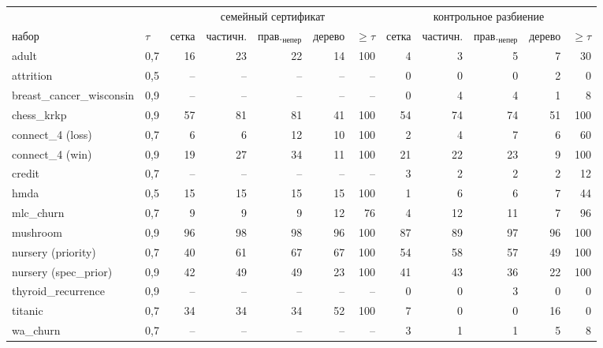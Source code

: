 \begin{tabular}{llrrrrrrrrrr}
\toprule
& & \multicolumn{5}{c}{семейный сертификат} & \multicolumn{5}{c}{контрольное разбиение}\\
набор & $\tau$ & сетка & частичн. & прав.$_{\mathrm{непер}}$ & дерево & $\ge\tau$ & сетка & частичн. & прав.$_{\mathrm{непер}}$ & дерево & $\ge\tau$\\
\midrule
adult & 0{,}7 & 16 & 23 & 22 & 14 & 100 & 4 & 3 & 5 & 7 & 30\\
attrition & 0{,}5 & -- & -- & -- & -- & -- & 0 & 0 & 0 & 2 & 0\\
breast\_cancer\_wisconsin & 0{,}9 & -- & -- & -- & -- & -- & 0 & 4 & 4 & 1 & 8\\
chess\_krkp & 0{,}9 & 57 & 81 & 81 & 41 & 100 & 54 & 74 & 74 & 51 & 100\\
connect\_4 (loss) & 0{,}7 & 6 & 6 & 12 & 10 & 100 & 2 & 4 & 7 & 6 & 60\\
connect\_4 (win) & 0{,}9 & 19 & 27 & 34 & 11 & 100 & 21 & 22 & 23 & 9 & 100\\
credit & 0{,}7 & -- & -- & -- & -- & -- & 3 & 2 & 2 & 2 & 12\\
hmda & 0{,}5 & 15 & 15 & 15 & 15 & 100 & 1 & 6 & 6 & 7 & 44\\
mlc\_churn & 0{,}7 & 9 & 9 & 9 & 12 & 76 & 4 & 12 & 11 & 7 & 96\\
mushroom & 0{,}9 & 96 & 98 & 98 & 96 & 100 & 87 & 89 & 97 & 96 & 100\\
nursery (priority) & 0{,}7 & 40 & 61 & 67 & 67 & 100 & 54 & 58 & 57 & 49 & 100\\
nursery (spec\_prior) & 0{,}9 & 42 & 49 & 49 & 23 & 100 & 41 & 43 & 36 & 22 & 100\\
thyroid\_recurrence & 0{,}9 & -- & -- & -- & -- & -- & 0 & 0 & 3 & 0 & 0\\
titanic & 0{,}7 & 34 & 34 & 34 & 52 & 100 & 7 & 0 & 0 & 16 & 0\\
wa\_churn & 0{,}7 & -- & -- & -- & -- & -- & 3 & 1 & 1 & 5 & 8\\
\bottomrule
\end{tabular}
